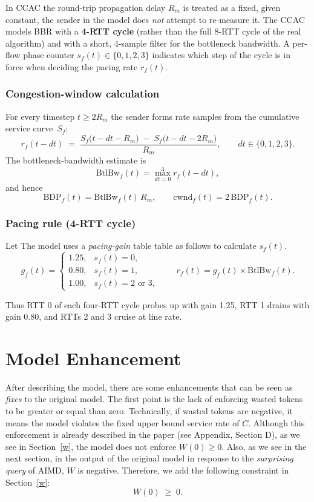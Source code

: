 \documentclass[12pt]{l4dc2023}
\begin{document}
In CCAC the round-trip propagation delay $R_m$ is treated as a fixed, given constant, the sender in the model does \emph{not} attempt to
re-measure it. The CCAC models BBR with a \textbf{4-RTT cycle} (rather than the full 8-RTT cycle of the real algorithm) and with a short,
4-sample filter for the bottleneck bandwidth. A per-flow phase counter \(s_f(t)\in\{0,1,2,3\}\) indicates which step of the cycle is in force when deciding the pacing rate \(r_f(t)\).

\subsubsection{Congestion-window calculation} \label{bbr_cwnd}
For every timestep \(t\ge 2R_m\) the sender forms rate samples from the cumulative service curve~\(S_f\):
\[
  r_f(t-dt)\;=\;
    \frac{S_f\bigl(t-dt-R_m\bigr)\;-\;
          S_f\bigl(t-dt-2R_m\bigr)}{R_m},
  \qquad dt\in\{0,1,2,3\}.
\]
The bottleneck-bandwidth estimate is
\[
  \text{BtlBw}_f(t)=\max_{dt=0}^{3} r_f(t-dt),
\]
and hence
\[
  \text{BDP}_f(t)=\text{BtlBw}_f(t)\,R_m,
  \qquad
  \mathrm{cwnd}_f(t)=2\,\text{BDP}_f(t).
\]

\subsubsection{Pacing rule (4-RTT cycle)}\label{bbr_pace}
Let
The model uses a \emph{pacing-gain} table table as follows to calculate $s_f(t)$.
\[
  g_f(t)=
  \begin{cases}
    1.25,& s_f(t)=0,\\[2pt]
    0.80,& s_f(t)=1,\\[2pt]
    1.00,& s_f(t)=2\text{ or }3,
  \end{cases}
\qquad
  r_f(t)=g_f(t)\times\text{BtlBw}_f(t).
\]

Thus RTT 0 of each four-RTT cycle probes up with gain 1.25, RTT 1 drains with gain 0.80, and RTTs 2 and 3 cruise at line rate.


\section{Model Enhancement} \label{enhancements}
After describing the model, there are some enhancements that can be seen as \emph{fixes} to the original model. The first point is the lack of enforcing wasted tokens to be greater or equal than zero. Technically, if wasted tokens are negative, it means the model violates the fixed upper bound service rate of \(C\). Although this enforcement is already described in the paper (see Appendix, Section D), as we see in Section~\ref{w}, the model does not enforce \(W(0)\ge0\). Also, as we see in the next section, in the output of the original model in response to the \emph{surprising query} of AIMD, \(W\) is negative. Therefore, we add the following constraint in Section~\ref{w}:
\[
  W(0)\;\ge\;0.
\]
\end{document}
